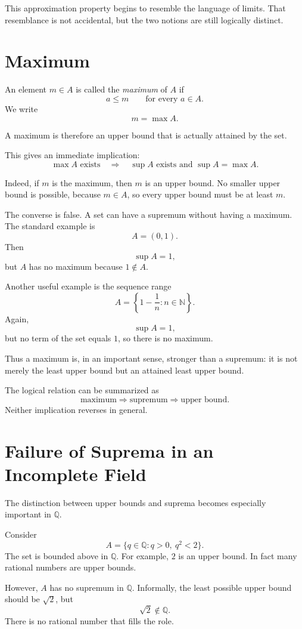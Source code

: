 \documentclass{essay}
\begin{document}
This approximation property begins to resemble the language of limits. That resemblance is not accidental, but the two notions are still logically distinct.

\section{Maximum}

An element \(m\in A\) is called the \emph{maximum} of \(A\) if
\[ a\leq m \qquad\text{for every }a\in A. \]
We write
\[ m=\max A. \]

A maximum is therefore an upper bound that is actually attained by the set.

This gives an immediate implication:
\[ \max A \text{ exists} \quad\Longrightarrow\quad \sup A \text{ exists and }\sup A=\max A. \]

Indeed, if \(m\) is the maximum, then \(m\) is an upper bound. No smaller upper bound is possible, because \(m\in A\), so every upper bound must be at least \(m\).

The converse is false. A set can have a supremum without having a maximum. The standard example is
\[ A=(0,1). \]
Then
\[ \sup A=1, \]
but \(A\) has no maximum because \(1\notin A\).

Another useful example is the sequence range
\[ A=\left\{1-\frac{1}{n}:n\in\mathbb{N}\right\}. \]
Again,
\[ \sup A=1, \]
but no term of the set equals \(1\), so there is no maximum.

Thus a maximum is, in an important sense, stronger than a supremum: it is not merely the least upper bound but an attained least upper bound.

The logical relation can be summarized as
\[ \text{maximum} \Longrightarrow \text{supremum} \Longrightarrow \text{upper bound}. \]
Neither implication reverses in general.

\section{Failure of Suprema in an Incomplete Field}

The distinction between upper bounds and suprema becomes especially important in \(\mathbb{Q}\).

Consider
\[ A=\{q\in\mathbb{Q}:q>0,\ q^{2}<2\}. \]
The set is bounded above in \(\mathbb{Q}\). For example, \(2\) is an upper bound. In fact many rational numbers are upper bounds.

However, \(A\) has no supremum in \(\mathbb{Q}\). Informally, the least possible upper bound should be \(\sqrt{2}\), but
\[ \sqrt{2}\notin\mathbb{Q}. \]
There is no rational number that fills the role.
\end{document}
